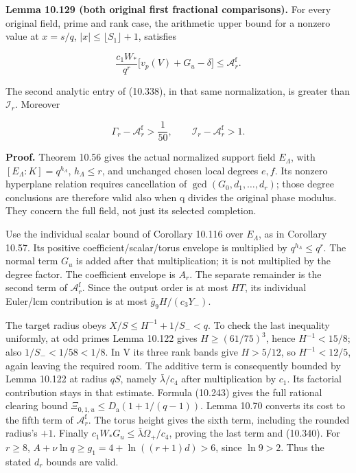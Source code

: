 \documentclass[
  11pt,
  a4paper,
]{article}
\begin{document}
\textbf{Lemma 10.129 (both original first fractional comparisons).} For
every original field, prime and rank case, the arithmetic upper bound
for a nonzero value at \(x=s/q\), \(|x|\le\lfloor S_1\rfloor+1\),
satisfies

\[
\frac{c_1W_*}{q^r}
\bigl[v_p(V)+G_u-\delta\bigr]\le\mathcal A_r^{\mathrm f}.
\tag{10.340}
\]

The second analytic entry of (10.338), in that same normalization, is
greater than \(\mathcal I_r\). Moreover

\[
\Gamma_r-\mathcal A_r^{\mathrm f}>\frac1{50},\qquad
\mathcal I_r-\mathcal A_r^{\mathrm f}>1.
\tag{10.341}
\]

\textbf{Proof.} Theorem 10.56 gives the actual normalized support field
\(E_\Lambda\), with \([E_\Lambda:K]=q^{h_\Lambda}\), \(h_\Lambda\le r\),
and unchanged chosen local degrees \(e,f\). Its nonzero hyperplane
relation requires cancellation of \(\gcd(G_0,d_1,\ldots,d_r)\); those
degree conclusions are therefore valid also when q divides the original
phase modulus. They concern the full field, not just its selected
completion.

Use the individual scalar bound of Corollary 10.116 over \(E_\Lambda\),
as in Corollary 10.57. Its positive coefficient/scalar/torus envelope is
multiplied by \(q^{h_\Lambda}\le q^r\). The normal term \(G_u\) is added
after that multiplication; it is not multiplied by the degree factor.
The coefficient envelope is \(A_r\). The separate remainder is the
second term of \(\mathcal A_r^{\mathrm f}\). Since the output order is
at most \(HT\), its individual Euler/lcm contribution is at most
\(\bar g_9H/(c_3Y_-)\).

The target radius obeys \(X/S\le H^{-1}+1/S_-<q\). To check the last
inequality uniformly, at odd primes Lemma 10.122 gives
\(H\ge(61/75)^3\), hence \(H^{-1}<15/8\); also \(1/S_-<1/58<1/8\). In V
its three rank bands give \(H>5/12\), so \(H^{-1}<12/5\), again leaving
the required room. The additive term is consequently bounded by Lemma
10.122 at radius \(qS\), namely \(\bar\lambda/c_4\) after multiplication
by \(c_1\). Its factorial contribution stays in that estimate. Formula
(10.243) gives the full rational clearing bound
\(\Xi_{0,1,u}\le D_{\mathrm a}(1+1/(q-1))\). Lemma 10.70 converts its
cost to the fifth term of \(\mathcal A_r^{\mathrm f}\). The torus height
gives the sixth term, including the rounded radius's \(+1\). Finally
\(c_1W_*G_u\le\bar\lambda\Omega_+/c_4\), proving the last term and
(10.340). For \(r\ge8\), \(A+\nu\ln q\ge g_1=4+\ln((r+1)d)>6\), since
\(\ln9>2\). Thus the stated \(d_r\) bounds are valid.
\end{document}
